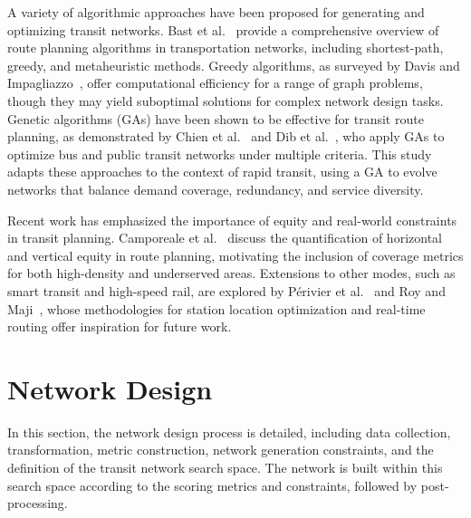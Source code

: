 \documentclass[sigconf,nonacm]{acmart}
\begin{document}
A variety of algorithmic approaches have been proposed for generating and optimizing transit networks. Bast et al.~\cite{bast2016route} provide a comprehensive overview of route planning algorithms in transportation networks, including shortest-path, greedy, and metaheuristic methods. Greedy algorithms, as surveyed by Davis and Impagliazzo~\cite{davis2007greedy}, offer computational efficiency for a range of graph problems, though they may yield suboptimal solutions for complex network design tasks. Genetic algorithms (GAs) have been shown to be effective for transit route planning, as demonstrated by Chien et al.~\cite{chien2001genetic} and Dib et al.~\cite{bib:dib2017ga}, who apply GAs to optimize bus and public transit networks under multiple criteria. This study adapts these approaches to the context of rapid transit, using a GA to evolve networks that balance demand coverage, redundancy, and service diversity.

Recent work has emphasized the importance of equity and real-world constraints in transit planning. Camporeale et al.~\cite{camporeale2016equity} discuss the quantification of horizontal and vertical equity in route planning, motivating the inclusion of coverage metrics for both high-density and underserved areas. Extensions to other modes, such as smart transit and high-speed rail, are explored by P\'erivier et al.~\cite{perivier2021realtime} and Roy and Maji~\cite{roy2023hsr}, whose methodologies for station location optimization and real-time routing offer inspiration for future work.

\section{Network Design}

In this section, the network design process is detailed, including data collection, transformation, metric construction, network generation constraints, and the definition of the transit network search space. The network is built within this search space according to the scoring metrics and constraints, followed by post-processing.
\end{document}
